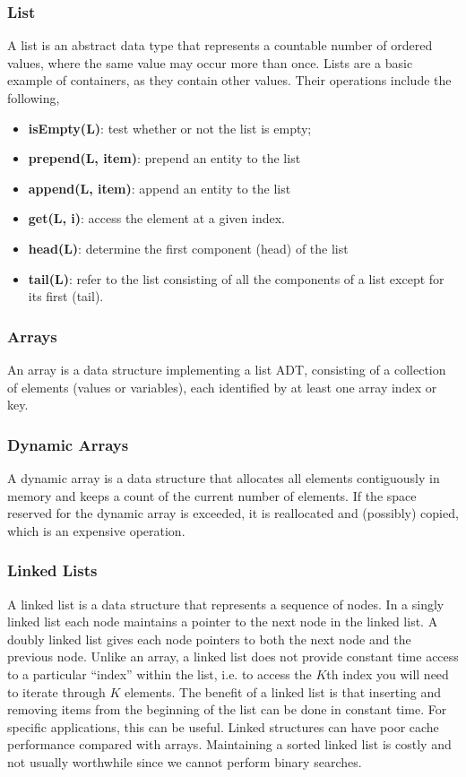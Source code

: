 \documentclass{article}
\begin{document}
    \subsubsection{List}
    A list is an abstract data type that represents a countable number of ordered values, where the same value may occur more than once. Lists are a basic example of containers, as they contain other values. Their operations include the following,
    \begin{itemize}
        \item \textbf{isEmpty(L)}: test whether or not the list is empty;
        \item \textbf{prepend(L, item)}: prepend an entity to the list
        \item \textbf{append(L, item)}: append an entity to the list
        \item \textbf{get(L, i)}: access the element at a given index.
        \item \textbf{head(L)}: determine the first component (head) of the list
        \item \textbf{tail(L)}: refer to the list consisting of all the components of a list except for its first (tail).
    \end{itemize}
    
    \subsubsection{Arrays}
    An array is a data structure implementing a list ADT, consisting of a collection of elements (values or variables), each identified by at least one array index or key.
    
    \subsubsection{Dynamic Arrays}
    A dynamic array is a data structure that allocates all elements contiguously in memory and keeps a count of the current number of elements. If the space reserved for the dynamic array is exceeded, it is reallocated and (possibly) copied, which is an expensive operation.
    
    \subsubsection{Linked Lists}
    A linked list is a data structure that represents a sequence of nodes. In a singly linked list each node maintains a pointer to the next node in the linked list. A doubly linked list gives each node pointers to both the next node and the previous node. Unlike an array, a linked list does not provide constant time access to a particular ``index'' within the list, i.e. to access the $K$th index you will need to iterate through $K$ elements. The benefit of a linked list is that inserting and removing items from the beginning of the list can be done in constant time. For specific applications, this can be useful. Linked structures can have poor cache performance compared with arrays. Maintaining a sorted linked list is costly and not usually worthwhile since we cannot perform binary searches.
    
\end{document}
